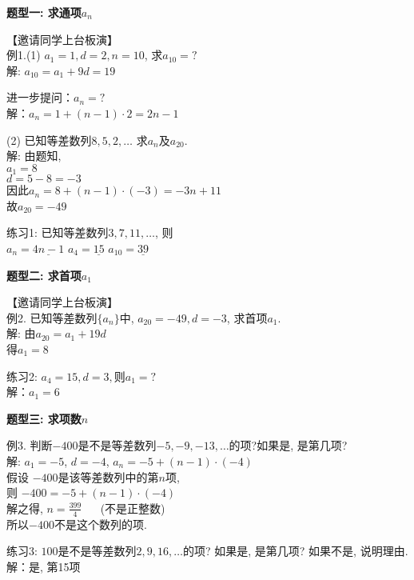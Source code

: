 \documentclass[10pt,a4paper]{article}
\begin{document}
			\textbf{题型一: 求通项$a_n$}

				【邀请同学上台板演】\\
				例1.(1) $a_1=1, d=2, n=10$, 求$a_{10}=?$\\ 
				{\color{cyan} 解: $a_{10}=a_1+9d  =19$}

				进一步提问：$a_n=?$\\
				{\color{cyan} 解：$a_n=1+(n-1)\cdot 2=2n-1$}

				(2) 已知等差数列$8, 5, 2, \ldots$ 求$a_n$及$a_{20}$.\\ 
				{\color{cyan} 解: 由题知, \\ $a_1=8$\\ 
				$d=5-8=-3$\\ 
				因此$a_n=8+(n-1)\cdot(-3)=-3n+11$\\ 
				故$a_{20}=-49$}
					

				练习1: 已知等差数列$3, 7, 11, \ldots$, 则\\ 
				{\color{cyan} $a_n=\underline{4n-1}$ \hspace{30pt} 
				$a_4=\underline{15}$ \hspace{30pt} 
				$a_{10}=\underline{39}$	}
	
	

			\textbf{题型二: 求首项$a_1$}

				【邀请同学上台板演】\\
				例2. 已知等差数列$\{a_n\}$中, $a_{20}=-49, d=-3$, 求首项$a_1$.\\
				{\color{cyan} 解: 由$a_{20}=a_1+19d$ \\  
				得$a_1=8$}
					

				练习2: $a_4=15, d=3, 则a_1=?$\\
				{\color{cyan} 解：$a_1=6$}
	
	

			\textbf{题型三: 求项数$n$}

				例3. 判断$-400$是不是等差数列$-5, -9, -13, \ldots$的项?如果是, 是第几项? \\ 
				{\color{cyan} 解: $a_1=-5$,  $d=-4$,  $a_n=-5+(n-1)\cdot(-4)$\\ 
				假设 $-400$是该等差数列中的第$n$项, \\ 
				则 $-400=-5+(n-1)\cdot(-4)$ \\ 
				解之得, $n=\frac{399}{4} \hspace{20pt}$(不是正整数) \\ 
				所以$-400$不是这个数列的项. }
					

				练习3: $100$是不是等差数列$2, 9, 16, \ldots$的项? 如果是, 是第几项? 如果不是, 说明理由. \\ 
				{\color{cyan} 解：是, 第15项}
	
\end{document}
